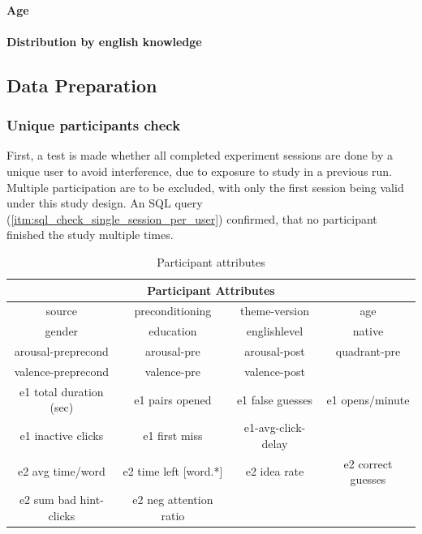 	\paragraph{Age}
	
	
	

	\paragraph{Distribution by english knowledge} 
	
	
	
	\subsection{Data Preparation}
	
	\subsubsection{Unique participants check} First, a test is made whether all completed experiment sessions are done by a unique user to avoid interference, due to exposure to study in a previous run. Multiple participation are to be excluded, with only the first session being valid under this study design. An SQL query (\ref{itm:sql_check_single_session_per_user}) confirmed, that no participant finished the study multiple times.
	
	\begin{table}
		\begin{center}
			\begin{tabular}{|c|c|c|c|}
				\hline
				\multicolumn{4}{|c|}{Participant Attributes} \\ 
				\hline 
				source & preconditioning & theme-version & age \\ 
				\hline 
				gender & education & englishlevel & native \\ 
				\hline 
				arousal-preprecond & arousal-pre & arousal-post & quadrant-pre \\ 
				\hline 
				valence-preprecond & valence-pre & valence-post & \\ 
				\hline 
				e1 total duration (sec) & e1 pairs opened & e1 false guesses & e1 opens/minute \\ 
				\hline 
				e1 inactive clicks & e1 first miss & e1-avg-click-delay &  \\ 
				\hline 
				e2 avg time/word & e2 time left [word.*]  & e2 idea rate & e2 correct guesses \\
				\hline
				e2 sum bad hint-clicks & e2 neg attention ratio & & \\
				\hline
			\end{tabular} 
		\end{center}
		\caption{Participant attributes}
		\label{fig:participant_attributes}
	\end{table}

